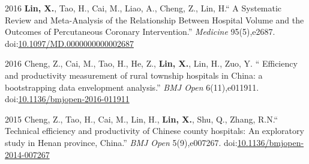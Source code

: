 \documentclass[12pt,letterpaper]{report}
\begin{document}
\begin{tablist}
		\item[2016] \tab \textbf{Lin, X.}, Tao, H., Cai, M., Liao, A., Cheng, Z., Lin, H.\enquote{ A Systematic Review and Meta-Analysis of the Relationship Between Hospital Volume and the Outcomes of Percutaneous Coronary Intervention.} \textit{Medicine}  95(5),e2687. doi:\href{https://doi.org/10.1097/MD.0000000000002687}{10.1097/MD.0000000000002687}
				
		\item[2016] \tab Cheng, Z., Cai, M., Tao, H., He, Z., \textbf{Lin, X.}, Lin, H., Zuo, Y. \enquote{ Efficiency and productivity measurement of rural township hospitals in China: a bootstrapping data envelopment analysis.} \textit{BMJ Open}  6(11),e011911. doi:\href{https://doi.org/10.1136/bmjopen-2016-011911}{10.1136/bmjopen-2016-011911}
		
		\item[2015] \tab Cheng, Z., Tao, H., Cai, M., Lin, H., \textbf{Lin, X.}, Shu, Q., Zhang, R.N.\enquote{ Technical efficiency and productivity of Chinese county hospitals: An exploratory study in Henan province, China.} \textit{BMJ Open}  5(9),e007267. doi:\href{https://doi.org/10.1136/bmjopen-2014-007267}{10.1136/bmjopen-2014-007267}

 \end{tablist}
\end{document}

